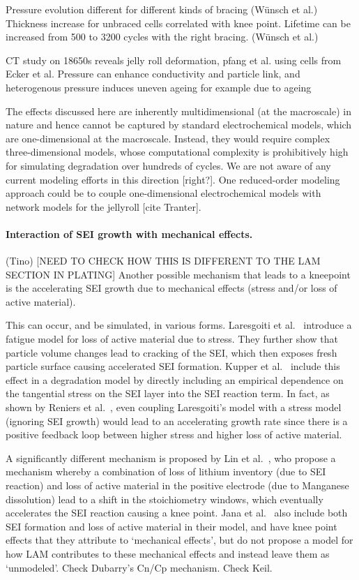 \documentclass{article}
\begin{document}
Pressure evolution different for different kinds of bracing (Wünsch et al.) Thickness increase for unbraced cells correlated with knee point. Lifetime can be increased from 500 to 3200 cycles with the right bracing. (Wünsch et al.)

CT study on 18650s reveals jelly roll deformation, pfang et al. \cite{pfrang_long-term_2018} using cells from Ecker et al. \cite{ecker_calendar_2014}
Pressure can enhance conductivity and particle link, and heterogenous pressure induces uneven ageing for example due to ageing \cite{bach_nonlinear_2016}

The effects discussed here are inherently multidimensional (at the macroscale) in nature and hence cannot be captured by standard electrochemical models, which are one-dimensional at the macroscale. Instead, they would require complex three-dimensional models, whose computational complexity is prohibitively high for simulating degradation over hundreds of cycles. We are not aware of any current modeling efforts in this direction [right?]. One reduced-order modeling approach could be to couple one-dimensional electrochemical models with network models for the jellyroll [cite Tranter].

\paragraph{Interaction of SEI growth with mechanical effects.} (Tino) [NEED TO CHECK HOW THIS IS DIFFERENT TO THE LAM SECTION IN PLATING]
Another possible mechanism that leads to a kneepoint is the accelerating SEI growth due to mechanical effects (stress and/or loss of active material).

This can occur, and be simulated, in various forms.
Laresgoiti et al.~\cite{laresgoiti_modeling_2015} introduce a fatigue model for loss of active material due to stress. They further show that particle volume changes lead to cracking of the SEI, which then exposes fresh particle surface causing accelerated SEI formation. Kupper et al.~\cite{kupper_end--life_2018} include this effect in a degradation model by directly including an empirical dependence on the tangential stress on the SEI layer into the SEI reaction term. In fact, as shown by Reniers et al.~\cite{reniers_review_2019}, even coupling Laresgoiti's model with a stress model (ignoring SEI growth) would lead to an accelerating growth rate since there is a positive feedback loop between higher stress and higher loss of active material.

A significantly different mechanism is proposed by Lin et al.~\cite{lin_comprehensive_2013}, who propose a mechanism whereby a combination of loss of lithium inventory (due to SEI reaction) and loss of active material in the positive electrode (due to Manganese dissolution) lead to a shift in the stoichiometry windows, which eventually accelerates the SEI reaction causing a knee point.
Jana et al.~\cite{jana_physical_2019} also include both SEI formation and loss of active material in their model, and have knee point effects that they attribute to `mechanical effects', but do not propose a model for how LAM contributes to these mechanical effects and instead leave them as `unmodeled'.
Check Dubarry's Cn/Cp mechanism.
Check Keil.
\end{document}
